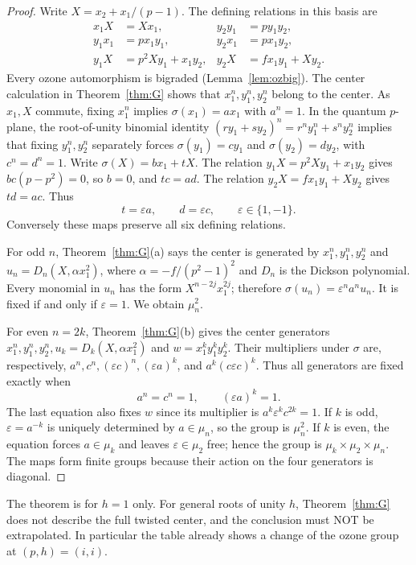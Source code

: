 \begin{proof}
Write $X=x_2+x_1/(p-1)$. The defining relations in this basis are
\begin{align*}
 x_1X&=Xx_1,&y_2y_1&=py_1y_2,\\
 y_1x_1&=px_1y_1,&y_2x_1&=px_1y_2,\\
 y_1X&=p^2Xy_1+x_1y_2,&y_2X&=f x_1y_1+Xy_2.
\end{align*}
Every ozone automorphism is bigraded (Lemma~\ref{lem:ozbig}). The center
calculation in Theorem~\ref{thm:G} shows that $x_1^n,y_1^n,y_2^n$ belong
to the center. As $x_1,X$ commute, fixing $x_1^n$ implies
$\sigma(x_1)=a x_1$ with $a^n=1$. In the quantum $p$-plane, the
root-of-unity binomial identity
$(r y_1+s y_2)^n=r^n y_1^n+s^n y_2^n$
implies that fixing $y_1^n,y_2^n$ separately forces
$\sigma(y_1)=c y_1$ and $\sigma(y_2)=d y_2$, with $c^n=d^n=1$.
Write $\sigma(X)=b x_1+t X$. The relation $y_1X=p^2Xy_1+x_1y_2$
gives $bc(p-p^2)=0$, so $b=0$, and $tc=ad$. The relation
$y_2X=f x_1y_1+Xy_2$ gives $td=ac$. Thus
\[
 t=\varepsilon a,\qquad d=\varepsilon c,\qquad
 \varepsilon\in\{1,-1\}.
\]
Conversely these maps preserve all six defining relations.

For odd $n$, Theorem~\ref{thm:G}(a) says the center is generated by
$x_1^n,y_1^n,y_2^n$ and
$u_n=D_n(X,\alpha x_1^2)$, where
$\alpha=-f/(p^2-1)^2$ and $D_n$ is the Dickson polynomial.
Every monomial in $u_n$ has the form $X^{n-2j}x_1^{2j}$;
therefore $\sigma(u_n)=\varepsilon^n a^n u_n$. It is fixed if and
only if $\varepsilon=1$. We obtain $\mu_n^2$.

For even $n=2k$, Theorem~\ref{thm:G}(b) gives the center generators
$x_1^n,y_1^n,y_2^n,u_k=D_k(X,\alpha x_1^2)$ and
$w=x_1^k y_1^k y_2^k$. Their multipliers under $\sigma$ are,
respectively, $a^n,c^n,(\varepsilon c)^n,
(\varepsilon a)^k$, and $a^k(c\varepsilon c)^k$.
Thus all generators are fixed exactly when
\[
 a^n=c^n=1,\qquad (\varepsilon a)^k=1.
\]
The last equation also fixes $w$ since its multiplier is
$a^k\varepsilon^kc^{2k}=1$.
If $k$ is odd, $\varepsilon=a^{-k}$ is uniquely determined by
$a\in\mu_n$, so the group is $\mu_n^2$. If $k$ is even, the equation
forces $a\in\mu_k$ and leaves $\varepsilon\in\mu_2$ free; hence the
group is $\mu_k\times\mu_2\times\mu_n$. The maps form finite groups
because their action on the four generators is diagonal.
\end{proof}

\begin{remark}
The theorem is for $h=1$ only. For general roots of unity $h$,
Theorem~\ref{thm:G} does not describe the full twisted center, and the
conclusion must NOT be extrapolated. In particular the table already
shows a change of the ozone group at $(p,h)=(i,i)$.
\end{remark}

